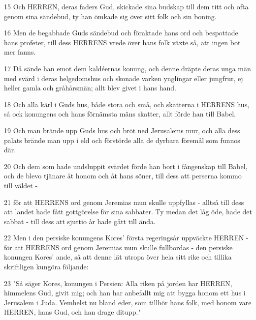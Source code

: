 \par 15 Och HERREN, deras faders Gud, skickade sina budskap till dem titt och ofta genom sina sändebud, ty han ömkade sig över sitt folk och sin boning.
\par 16 Men de begabbade Guds sändebud och föraktade hans ord och bespottade hans profeter, till dess HERRENS vrede över hans folk växte så, att ingen bot mer fanns.
\par 17 Då sände han emot dem kaldéernas konung, och denne dräpte deras unga män med svärd i deras helgedomshus och skonade varken ynglingar eller jungfrur, ej heller gamla och gråhårsmän; allt blev givet i hans hand.
\par 18 Och alla kärl i Guds hus, både stora och små, och skatterna i HERRENS hus, så ock konungens och hans förnämsta mäns skatter, allt förde han till Babel.
\par 19 Och man brände upp Guds hus och bröt ned Jerusalems mur, och alla dess palats brände man upp i eld och förstörde alla de dyrbara föremål som funnos där.
\par 20 Och dem som hade undsluppit svärdet förde han bort i fångenskap till Babel, och de blevo tjänare åt honom och åt hans söner, till dess att perserna kommo till väldet -
\par 21 för att HERRENS ord genom Jeremias mun skulle uppfyllas - alltså till dess att landet hade fått gottgörelse för sina sabbater. Ty medan det låg öde, hade det sabbat - till dess att sjuttio år hade gått till ända.
\par 22 Men i den persiske konungens Kores' första regeringsår uppväckte HERREN - för att HERRENS ord genom Jeremias mun skulle fullbordas - den persiske konungen Kores' ande, så att denne lät utropa över hela sitt rike och tillika skriftligen kungöra följande:
\par 23 "Så säger Kores, konungen i Persien: Alla riken på jorden har HERREN, himmelens Gud, givit mig; och han har anbefallt mig att bygga honom ett hus i Jerusalem i Juda. Vemhelst nu bland eder, som tillhör hans folk, med honom vare HERREN, hans Gud, och han drage ditupp."


